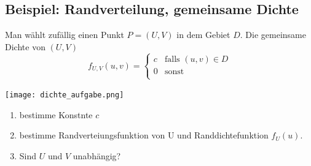 \subsection{Beispiel: Randverteilung, gemeinsame Dichte}
Man wählt zufällig einen Punkt $P = (U, V)$ in dem Gebiet $D$. Die gemeinsame Dichte von $(U, V)$
\[
  f_{U, V} (u, v) =
  \begin{cases}
    c & \text{falls } (u, v) \in D \\
    0 & \text{sonst}               \\
  \end{cases}
\]
\begin{center}
  \texttt{[image: dichte\_aufgabe.png]}
\end{center}
\begin{enumerate}[noitemsep,topsep=0pt,parsep=0pt,partopsep=0pt]  
  \item bestimme Konstnte $c$
  \item bestimme Randverteiungsfunktion von U und Randdichtefunktion $f_U(u)$.
  \item Sind $U$ und $V$ unabhängig?
\end{enumerate}
